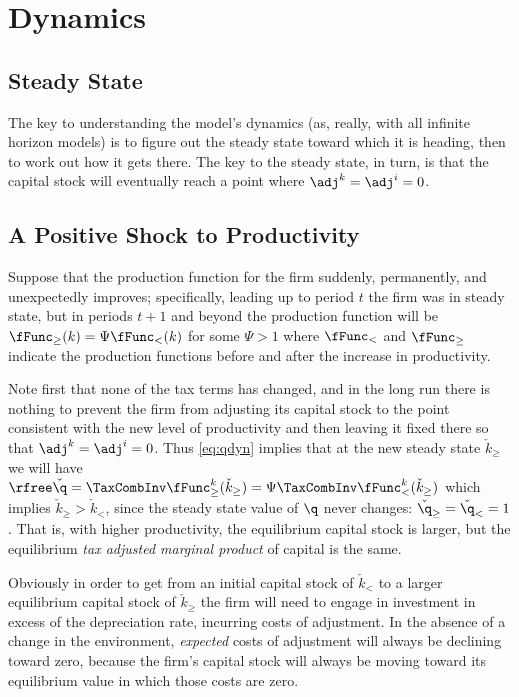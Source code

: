 \documentclass[headings=optiontotocandhead,toc=flat]{handout}
\begin{document}
\section[hypertarget={Dynamics}]{Dynamics}

\subsection[hypertarget={Steady-State}]{Steady State}

The key to understanding the model's dynamics (as, really, with all infinite horizon models) is to figure out the steady state toward which it is heading, then to work out how it gets there.  The key to the steady state, in turn, is that the capital stock will eventually
reach a point where $\adj^{k}=\adj^{i}=0$.

\subsection[hypertarget={PtyShk}]{A Positive Shock to Productivity}

Suppose that the production function for the firm suddenly,
permanently, and unexpectedly improves; specifically, 
leading up to period $t$ the firm was in steady state, but in periods
$t+1$ and beyond the production function will be
$\fFunc_{\geq}(k)=\Psi \fFunc_{<}(k)$ for some $\Psi>1$ where
$\fFunc_{<}$ and $\fFunc_{\geq}$ indicate the production
functions before and after the increase in productivity.

Note first that none of the tax terms has changed, and in the long run
there is nothing to prevent the firm from adjusting its capital stock
to the point consistent with the new level of productivity and then
leaving it fixed there so that $\adj^{k}=\adj^{i}=0$.
Thus \eqref{eq:qdyn} implies that at the new steady state
$\check{k}_{\geq}$ we will have $\rfree \check{\q} = \TaxCombInv
\fFunc_{\geq}^{k}(\check{k}_{\geq}) = \Psi \TaxCombInv
\fFunc_{<}^{k}(\check{k}_{\geq})$ which implies $\check{k}_{\geq} >
\check{k}_{<}$, since the steady state value of $\q$ never changes:
$\check{\q}_{\geq} = \check{\q}_{<} = 1$.  That is, with higher
productivity, the equilibrium capital stock is larger, but the
equilibrium {\it tax adjusted marginal product} of capital is the
same.

Obviously in order to get from an initial capital stock of $\check{k}_{<}$
to a larger equilibrium capital stock of $\check{k}_{\geq}$ the firm will need
to engage in investment in excess of the depreciation rate, incurring costs
of adjustment.  In the absence of a change in the environment, {\it expected}
costs of adjustment will always be declining toward zero, because the
firm's capital stock will always be moving toward its equilibrium value
in which those costs are zero.
\end{document}
